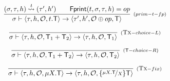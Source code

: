 \documentclass[a4paper,UKenglish]{article}%
\theoremstyle{plain}
\begin{document}
\[
\infer[{\scriptstyle{(prim-t-fp)}}]
{\thdstack \vdash \langle \txstack, \heap, \mathcal{O}, t.\trans  \rangle \rightarrow \langle \txstack', \heap', \mathcal{O} \oplus op, \trans \rangle}
{(\thdstack, \txstack, \heap) \toT{t} (\txstack', \heap') \qquad \fingerprint(t,\thdstack,\txstack,\h) = op}
\]


\[
\infer[{\scriptstyle{(\Tx-choice-L)}}]{\thdstack \vdash \langle \txstack, \heap, \mathcal{O}, \trans_1 + \trans_2 \rangle 
\rightarrow \langle  \txstack, \heap, \mathcal{O}, \trans_1 \rangle}{}
\]

\[
\infer[{\scriptstyle{(\trans-choice-R)}}]{\thdstack \vdash \langle \txstack, \heap, \mathcal{O}, \trans_1 + \trans_2 \rangle 
\rightarrow \langle  \txstack, \heap, \mathcal{O}, \trans_2 \rangle}{}
\]

\[
\infer[{\scriptstyle{(\Tx-fix)}}]{\thdstack \vdash \langle \txstack, \heap, \mathcal{O}, \mu X.\trans \rangle 
\rightarrow \langle  \txstack, \heap, \mathcal{O}, \{\nicefrac{\mu X.\trans}{X}\}\trans \rangle}{}
\]
\end{document}
